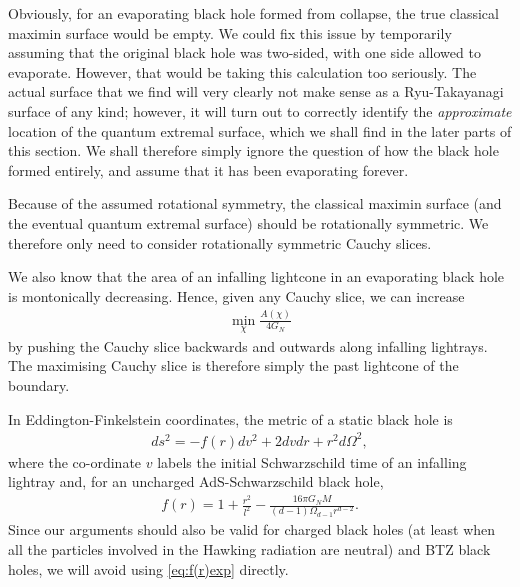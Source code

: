 \documentclass[11pt,a4paper]{article}
\begin{document}
Obviously, for an evaporating black hole formed from collapse, the true classical maximin surface would be empty. We could fix this issue by temporarily assuming that the original black hole was two-sided, with one side allowed to evaporate. However, that would be taking this calculation too seriously. The actual surface that we find will very clearly not make sense as a Ryu-Takayanagi surface of any kind; however, it will turn out to correctly identify the \emph{approximate} location of the quantum extremal surface, which we shall find in the later parts of this section. We shall therefore simply ignore the question of how the black hole formed entirely, and assume that it has been evaporating forever.

Because of the assumed rotational symmetry, the classical maximin surface (and the eventual quantum extremal surface) should be rotationally symmetric. We therefore only need to consider rotationally symmetric Cauchy slices. 

We also know that the area of an infalling lightcone in an evaporating black hole is montonically decreasing. Hence, given any Cauchy slice, we can increase
\begin{align}
 \min_{\chi} \frac{A(\chi)}{4 G_N} 
\end{align}
by pushing the Cauchy slice backwards and outwards along infalling lightrays. The maximising Cauchy slice is therefore simply the past lightcone of the boundary.

In Eddington-Finkelstein coordinates, the metric of a static black hole is
\begin{align} \label{eq:staticmetric}
ds^2 = -f(r) dv^2 + 2 dv dr + r^2 d\Omega^2,
\end{align}
where the co-ordinate $v$ labels the initial Schwarzschild time of an infalling lightray and, for an uncharged AdS-Schwarzschild black hole, 
\begin{align} \label{eq:f(r)exp}
f(r) = 1 + \frac{r^2}{l^2} - \frac{16 \pi G_N M}{(d-1)\Omega_{d-1} r^{d-2}}.
\end{align}
Since our arguments should also be valid for charged black holes (at least when all the particles involved in the Hawking radiation are neutral) and BTZ black holes, we will avoid using \eqref{eq:f(r)exp} directly. 
\end{document}
